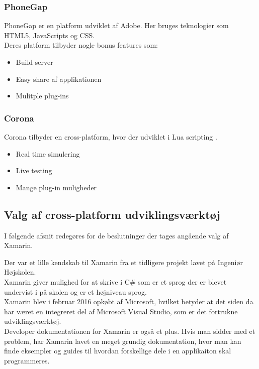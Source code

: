 \subsubsection{PhoneGap}
PhoneGap\cite{PhoneGap} er en platform udviklet af Adobe\cite{Adobe}. Her bruges teknologier som HTML5\cite{HTML5}, JavaScripts\cite{JavaScript} og CSS\cite{CSS}. \\
Deres platform tilbyder nogle bonus features som:
\begin{itemize}[-]
	\item Build server
	\item Easy share af applikationen 
	\item Mulitple plug-ins
\end{itemize}

\clearpage

\subsubsection{Corona}
Corona\cite{Corona} tilbyder en cross-platform, hvor der udviklet i Lua scripting \cite{Lua}.
\begin{itemize}[-]
	\item Real time simulering
	\item Live testing
	\item Mange plug-in muligheder
\end{itemize}

\subsection{Valg af cross-platform udviklingsværktøj}
I følgende afsnit redegøres for de beslutninger der tages angående valg af Xamarin.

Der var et lille kendskab til Xamarin fra et tidligere projekt lavet på Ingeniør Højskolen. \\
Xamarin giver mulighed for at skrive i C\# som er et sprog der er blevet undervist i på skolen og er et højniveau sprog. \\
Xamarin blev i februar 2016 opkøbt af Microsoft, hvilket betyder at det siden da har været en integreret del af Microsoft Visual Studio, som er det fortrukne udviklingsværktøj.\\
Developer dokumentationen for Xamarin er også et plus. Hvis man sidder med et problem, har Xamarin lavet en meget grundig dokumentation, hvor man kan finde eksempler og guides til hvordan forskellige dele i en applikaiton skal programmeres.

